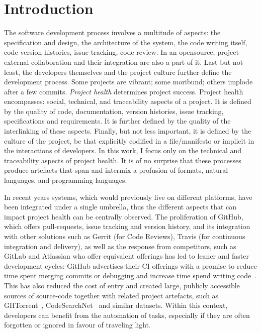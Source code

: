 \chapter{Introduction}
\label{chapter:introduction}

The software development process involves a multitude of aspects: the
specification and design, the architecture of the system, the code writing
itself, code version histories, issue tracking, code review. In an opensource,
project external collaboration and their integration are also a part of it. Last
but not least, the developers themselves and the project culture further define
the development process. Some projects are vibrant; some moribund; others
implode after a few commits. \emph{Project health} determines project success.
Project health encompasses: social, technical, and traceability aspects of a
project. It is defined by the quality of code, documentation, version histories,
issue tracking, specifications and requirements. It is further defined by the
quality of the interlinking of these aspects. Finally, but not less important,
it is defined by the culture of the project, be that explicitly codified in a
file/manifesto or implicit in the interactions of developers. In this work, I
focus only on the technical and traceability aspects of project health. It is of
no surprise that these processes produce artefacts that span and intermix a
profusion of formats, natural languages, and programming languages.

In recent years systems, which would previously live on different platforms,
have been integrated under a single umbrella, thus the different aspects that
can impact project health can be centrally observed. The proliferation of
GitHub, which offers pull-requests, issue tracking and version history, and its
integration with other solutions such as Gerrit (for Code Reviews), Travis (for
continuous integration and delivery), as well as the response from competitors,
such as GitLab and Atlassian who offer equivalent offerings has led to leaner
and faster development cycles: GitHub advertises their CI offerings with a
promise to reduce time spent merging commits or debugging and increase time
spend writing code~\cite{GitHubCI}. This has also reduced the cost of entry and
created large, publicly accessible sources of source-code together with related
project artefacts, such as GHTorrent~\cite{GHTorrent},
CodeSearchNet~\cite{Husain2019} and similar datasets. Within this context,
developers can benefit from the automation of tasks, especially if they are
often forgotten or ignored in favour of traveling light. 

